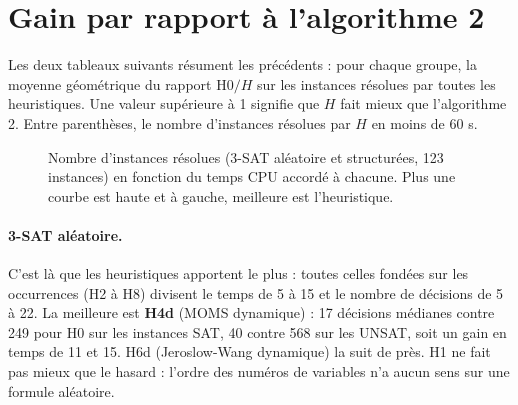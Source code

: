 \documentclass[11pt,a4paper]{article}
\newcommand{\cactus}[3]{\addplot[mark=none, thick, #3] table[x=cpu, y=solved]
  {generated/cactus-#1-#2.dat}; \addlegendentry{#2}}
\begin{document}
\clearpage
\section{Gain par rapport à l'algorithme 2}

Les deux tableaux suivants résument les précédents : pour chaque groupe, la
moyenne géométrique du rapport $\text{H0}/H$ sur les instances résolues par
toutes les heuristiques. Une valeur supérieure à 1 signifie que $H$ fait
mieux que l'algorithme 2. Entre parenthèses, le nombre d'instances
résolues par $H$ en moins de 60 s.

\begin{table}[htbp]\centering\footnotesize\setlength{\tabcolsep}{4pt}

\caption{Gain en temps CPU par rapport à H0 (nombre d'instances résolues).}
\label{tab:gain-temps}
\end{table}
\begin{table}[htbp]\centering\footnotesize\setlength{\tabcolsep}{4pt}

\caption{Gain en nombre de décisions par rapport à H0.}
\label{tab:gain-decisions}
\end{table}

\begin{figure}[htbp]\centering
{}
\caption{Nombre d'instances résolues (3-SAT aléatoire et structurées, 123
  instances) en fonction du temps CPU accordé à chacune. Plus une courbe est
  haute et à gauche, meilleure est l'heuristique.}
\label{fig:cactus-satlib}
\end{figure}

\paragraph{3-SAT aléatoire.} C'est là que les heuristiques apportent le
plus : toutes celles fondées sur les occurrences (H2 à H8) divisent le
temps de 5 à 15 et le nombre de décisions de 5 à 22. La meilleure est
\textbf{H4d} (MOMS dynamique) : 17 décisions médianes contre 249 pour H0
sur les instances SAT, 40 contre 568 sur les UNSAT, soit un gain en temps
de 11 et 15. H6d (Jeroslow-Wang dynamique) la suit de près. H1 ne fait
pas mieux que le hasard : l'ordre des numéros de variables n'a aucun sens
sur une formule aléatoire.
\end{document}
